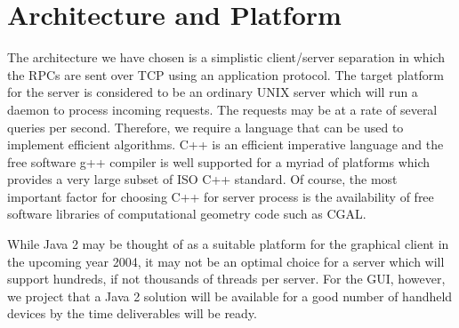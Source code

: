 \documentclass[a4paper,10pt]{article}
\begin{document}
\section{Architecture and Platform}

The architecture we have chosen is a simplistic client/server
separation in which the RPCs are sent over TCP using an application
protocol. The target platform for the server is considered to be an
ordinary UNIX server which will run a daemon to process incoming
requests. The requests may be at a rate of several queries per second.
Therefore, we require a language that can be used to implement
efficient algorithms.  C++ is an efficient imperative language and the
free software g++ compiler is well supported for a myriad of platforms
which provides a very large subset of ISO C++ standard. Of course, the
most important factor for choosing C++ for server process is the
availability of free software libraries of computational geometry code
such as CGAL.  \cite{cgal}

While Java 2 may be thought of as a suitable platform for the
graphical client in the upcoming year 2004, it may not be an optimal
choice for a server which will support hundreds, if not thousands of
threads per server.  For the GUI, however, we project that a Java 2
solution will be available for a good number of handheld devices by
the time deliverables will be ready.

 
\end{document}
